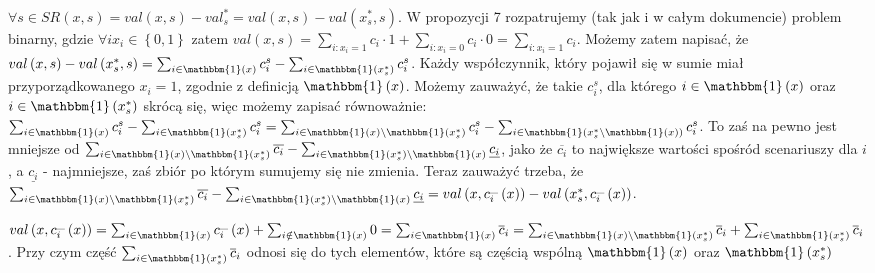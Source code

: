 $\forall s \in S R \left( x, s \right) = val \left( x, s \right) - val^{\ast}_{s} = val \left( x, s \right) - val \left( x_{s}^{\ast}, s \right)$. W propozycji 7 rozpatrujemy (tak jak i w całym dokumencie) problem binarny, gdzie $\forall i x_{i} \in \left\{ 0, 1 \right\}$ zatem $val \left( x, s \right) = \sum_{i : x_{i} = 1} c_{i} \cdot 1 + \sum_{i : x_{i} = 0} c_{i} \cdot 0 = \sum_{i : x_{i} = 1} c_{i}$. Możemy zatem napisać, że $val \left( x, s \right) - val \left( x_{s}^{\ast}, s \right) = \sum_{i \in \mathbbm{1} \left( x \right)} c_{i}^{s} - \sum_{i \in \mathbbm{1} \left( x_{s}^{\ast} \right)} c_{i}^{s}$. Każdy współczynnik, który pojawił się w sumie miał przyporządkowanego $x_{i} = 1$, zgodnie z definicją $\mathbbm{1} \left( x \right)$. Możemy zauważyć, że takie $c_{i}^{s}$, dla którego $i \in \mathbbm{1} \left( x \right)$ oraz $i \in \mathbbm{1} \left( x_{s}^{\ast} \right)$ skrócą się, więc możemy zapisać równoważnie: $\sum_{i \in \mathbbm{1} \left( x \right)} c_{i}^{s} - \sum_{i \in \mathbbm{1} \left( x_{s}^{\ast} \right)} c_{i}^{s} = \sum_{i \in \mathbbm{1} \left( x \right) \setminus \mathbbm{1} \left( x_{s}^{\ast} \right)} c_{i}^{s} - \sum_{i \in \mathbbm{1} \left( x_{s}^{\ast} \setminus \mathbbm{1} \left( x \right) \right)} c_{i}^{s}$. To zaś na pewno jest mniejsze od $\sum_{i \in \mathbbm{1} \left( x \right) \setminus \mathbbm{1} \left( x_{s}^{\ast} \right)} \overline{c_{i}} - \sum_{i \in \mathbbm{1} \left( x_{s}^{\ast}  \right) \setminus \mathbbm{1} \left( x \right)} \underline{c_{i}}$, jako że $\overline{c_{i}}$ to największe wartości spośród scenariuszy dla $i$, a $\underline{c_{i}}$ - najmniejsze, zaś zbiór po którym sumujemy się nie zmienia. Teraz zauważyć trzeba, że $\sum_{i \in \mathbbm{1} \left( x \right) \setminus \mathbbm{1} \left( x_{s}^{\ast} \right)} \overline{c_{i}} - \sum_{i \in \mathbbm{1} \left( x_{s}^{\ast}  \right) \setminus \mathbbm{1} \left( x \right)} \underline{c_{i}} = val \left( x, c_{i}^{\_} \left( x \right) \right) - val \left( x_{s}^{\ast}, c_{i}^{\_} \left( x \right) \right)$.

$val \left( x, c_{i}^{\_} \left( x \right) \right) = \sum_{i \in \mathbbm{1} \left( x \right)} c_{i}^{\_} \left( x \right) + \sum_{i \notin \mathbbm{1} \left( x \right)} 0 = \sum_{i \in \mathbbm{1} \left( x \right)} \overline{c}_{i} = \sum_{i \in \mathbbm{1} \left( x \right) \setminus \mathbbm{1} \left( x_{s}^{\ast} \right)} \overline{c}_{i} + \sum_{i \in \mathbbm{1} \left( x_{s}^{\ast} \right)} \overline{c}_{i}$. Przy czym część $\sum_{i \in \mathbbm{1} \left( x_{s}^{\ast} \right)} \overline{c}_{i}$ odnosi się do tych elementów, które są częścią wspólną $\mathbbm{1} \left( x \right)$ oraz $\mathbbm{1} \left( x_{s}^{\ast} \right)$

